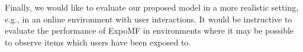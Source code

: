 Finally, we would like to evaluate our proposed model in a more realistic
setting, e.g., in an online environment with user interactions. It
would be instructive to evaluate the performance of ExpoMF in environments
where it may be possible to observe items which users have been exposed
to.

%
%

